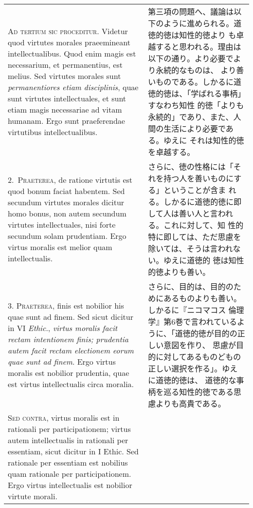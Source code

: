 \documentclass[10pt]{jsarticle}
\begin{document}
\begin{longtable}{p{21em}p{21em}}
{\scshape Ad tertium sic proceditur}. Videtur quod virtutes morales
praeemineant intellectualibus. Quod enim magis est necessarium, et
permanentius, est melius. Sed virtutes morales sunt {\itshape
permanentiores etiam disciplinis}, quae sunt virtutes intellectuales,
et sunt etiam magis necessariae ad vitam humanam. Ergo sunt
praeferendae virtutibus intellectualibus.


&

 第三項の問題へ、議論は以下のように進められる。道徳的徳は知性的徳より
 も卓越すると思われる。理由は以下の通り。より必要でより永続的なものは、
 より善いものである。しかるに道徳的徳は、「学ばれる事柄」すなわち知性
 的徳「よりも永続的」であり、また、人間の生活により必要である。ゆえに
 それは知性的徳を卓越する。

\\

2.~{\scshape Praeterea}, de ratione virtutis est quod bonum faciat
habentem. Sed secundum virtutes morales dicitur homo bonus, non autem
secundum virtutes intellectuales, nisi forte secundum solam
prudentiam. Ergo virtus moralis est melior quam intellectualis.

&

 さらに、徳の性格には「それを持つ人を善いものにする」ということが含ま
 れる。しかるに道徳的徳に即して人は善い人と言われる。これに対して、知
 性的特に即しては、ただ思慮を除いては、そうは言われない。ゆえに道徳的
 徳は知性的徳よりも善い。

\\


3. {\scshape Praeterea}, finis est nobilior his quae sunt ad
finem. Sed sicut dicitur in VI {\itshape Ethic}., {\itshape virtus
moralis facit rectam intentionem finis; prudentia autem facit rectam
electionem eorum quae sunt ad finem}. Ergo virtus moralis est nobilior
prudentia, quae est virtus intellectualis circa moralia.

&

 さらに、目的は、目的のためにあるものよりも善い。しかるに『ニコマコス
 倫理学』第6巻で言われているように、「道徳的徳が目的の正しい意図を作り、
 思慮が目的に対してあるものどもの正しい選択を作る」。ゆえに道徳的徳は、
 道徳的な事柄を巡る知性的徳である思慮よりも高貴である。
 

\\
{\scshape Sed contra}, virtus moralis est in rationali per
participationem; virtus autem intellectualis in rationali per
essentiam, sicut dicitur in I Ethic. Sed rationale per essentiam est
nobilius quam rationale per participationem. Ergo virtus
intellectualis est nobilior virtute morali.


\end{longtable}
\end{document}
